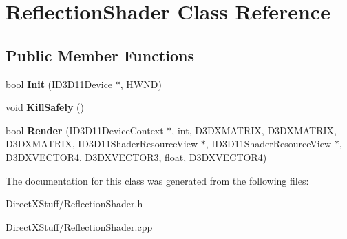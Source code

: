 \hypertarget{class_reflection_shader}{\section{Reflection\-Shader Class Reference}
\label{class_reflection_shader}
}
\subsection*{Public Member Functions}
\begin{DoxyCompactItemize}
\item 
\hypertarget{class_reflection_shader_afd8e2897838d5bbeb69fb36b140a50cb}{bool {\bfseries Init} (I\-D3\-D11\-Device $\ast$, H\-W\-N\-D)}\label{class_reflection_shader_afd8e2897838d5bbeb69fb36b140a50cb}

\item 
\hypertarget{class_reflection_shader_a8e63840bc794e0621e42945a9d9a79eb}{void {\bfseries Kill\-Safely} ()}\label{class_reflection_shader_a8e63840bc794e0621e42945a9d9a79eb}

\item 
\hypertarget{class_reflection_shader_ad370ca2f7bebca1c7f01b5d3b1fdfc12}{bool {\bfseries Render} (I\-D3\-D11\-Device\-Context $\ast$, int, D3\-D\-X\-M\-A\-T\-R\-I\-X, D3\-D\-X\-M\-A\-T\-R\-I\-X, D3\-D\-X\-M\-A\-T\-R\-I\-X, I\-D3\-D11\-Shader\-Resource\-View $\ast$, I\-D3\-D11\-Shader\-Resource\-View $\ast$, D3\-D\-X\-V\-E\-C\-T\-O\-R4, D3\-D\-X\-V\-E\-C\-T\-O\-R3, float, D3\-D\-X\-V\-E\-C\-T\-O\-R4)}\label{class_reflection_shader_ad370ca2f7bebca1c7f01b5d3b1fdfc12}

\end{DoxyCompactItemize}


The documentation for this class was generated from the following files\-:\begin{DoxyCompactItemize}
\item 
Direct\-X\-Stuff/Reflection\-Shader.\-h\item 
Direct\-X\-Stuff/Reflection\-Shader.\-cpp\end{DoxyCompactItemize}
